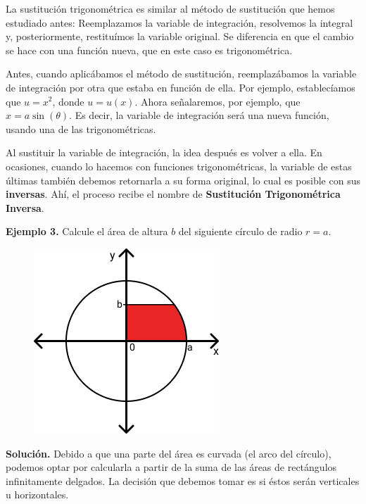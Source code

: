 \documentclass[12pt]{article}
\begin{document}
La sustitución trigonométrica es similar al método de sustitución que hemos estudiado antes: Reemplazamos la variable de integración, resolvemos la integral y, posteriormente, restituímos la variable original. Se diferencia en que el cambio se hace con una función nueva, que en este caso es trigonométrica.

Antes, cuando aplicábamos el método de sustitución, reemplazábamos la variable de integración por otra que estaba en función de ella. Por ejemplo, establecíamos que $u = x^{2}$, donde $u = u(x)$. Ahora señalaremos, por ejemplo, que $x = a\sin(\theta)$. Es decir, la variable de integración será una nueva función, usando una de las trigonométricas.

Al sustituir la variable de integración, la idea después es volver a ella. En ocasiones, cuando lo hacemos con funciones trigonométricas, la variable de estas últimas también debemos retornarla a su forma original, lo cual es posible con sus \textbf{inversas}. Ahí, el proceso recibe el nombre de \textbf{Sustitución Trigonométrica Inversa}.


\textbf{Ejemplo 3.} Calcule el área de altura $b$ del siguiente círculo de radio $r = a$.

\begin{figure}[hbt!]
\centering
\includegraphics[scale=0.6]{img/trig-int-example-1.jpg}
\end{figure}

\textbf{Solución.} Debido a que una parte del área es curvada (el arco del círculo), podemos optar por calcularla a partir de la suma de las áreas de rectángulos infinitamente delgados. La decisión que debemos tomar es si éstos serán verticales u horizontales.
\end{document}
